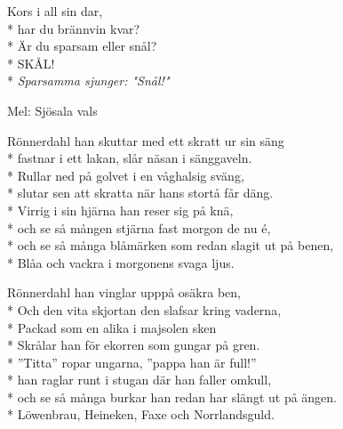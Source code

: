 \begin{SongText}[Hyfsvisa]
    \begin{SongVerse}
        Kors i all sin dar,\\*%
        har du brännvin kvar?\\*%
        Är du sparsam eller snål?\\*%
        SKÅL!\\*%
        \emph{Sparsamma sjunger: "Snål!"}
    \end{SongVerse}
\end{SongText}
\begin{SongText}[Rönnerdahl]
    \begin{SongInfo}
        Mel: Sjösala vals
    \end{SongInfo}
    \begin{SongVerse}
        Rönnerdahl han skuttar med ett skratt ur sin säng\\*%
        fastnar i ett lakan, slår näsan i sänggaveln.\\*%
        Rullar ned på golvet i en våghalsig sväng,\\*%
        slutar sen att skratta när hans stortå får däng.\\*%
        Virrig i sin hjärna han reser sig på knä,\\*%
        och se så mången stjärna fast morgon de nu é,\\*%
        och se så många blåmärken som redan slagit ut på benen,\\*%
        Blåa och vackra i morgonens svaga ljus.
    \end{SongVerse}
    \begin{SongVerse}
        Rönnerdahl han vinglar upppå osäkra ben,\\*%
        Och den vita skjortan den slafsar kring vaderna,\\*%
        Packad som en alika i majsolen sken\\*%
        Skrålar han för ekorren som gungar på gren.\\*%
        ”Titta” ropar ungarna, ”pappa han är full!”\\*%
        han raglar runt i stugan där han faller omkull,\\*%
        och se så många burkar han redan har slängt ut på ängen.\\*%
        Löwenbrau, Heineken, Faxe och Norrlandsguld.
    \end{SongVerse}
\end{SongText}
